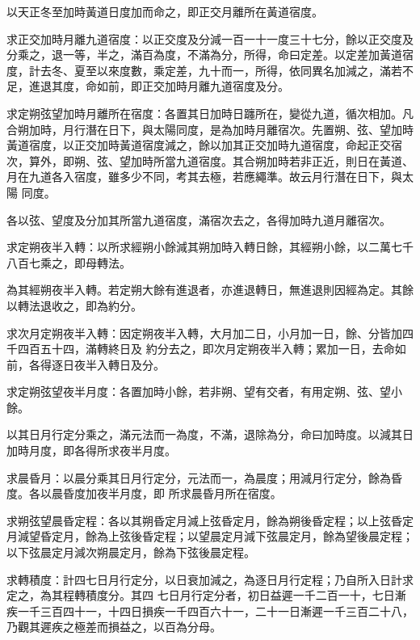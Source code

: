 \begin{pinyinscope}
 以天正冬至加時黃道日度加而命之，即正交月離所在黃道宿度。



 求正交加時月離九道宿度：以正交度及分減一百一十一度三十七分，餘以正交度及分乘之，退一等，半之，滿百為度，不滿為分，所得，命曰定差。以定差加黃道宿
 度，計去冬、夏至以來度數，乘定差，九十而一，所得，依同異名加減之，滿若不足，進退其度，命如前，即正交加時月離九道宿度及分。



 求定朔弦望加時月離所在宿度：各置其日加時日躔所在，變從九道，循次相加。凡合朔加時，月行潛在日下，與太陽同度，是為加時月離宿次。先置朔、弦、望加時黃道宿度，以正交加時黃道宿度減之，餘以加其正交加時九道宿度，命起正交宿次，算外，即朔、弦、望加時所當九道宿度。其合朔加時若非正近，則日在黃道、月在九道各入宿度，雖多少不同，考其去極，若應繩準。故云月行潛在日下，與太陽
 同度。



 各以弦、望度及分加其所當九道宿度，滿宿次去之，各得加時九道月離宿次。



 求定朔夜半入轉：以所求經朔小餘減其朔加時入轉日餘，其經朔小餘，以二萬七千八百七乘之，即母轉法。



 為其經朔夜半入轉。若定朔大餘有進退者，亦進退轉日，無進退則因經為定。其餘以轉法退收之，即為約分。



 求次月定朔夜半入轉：因定朔夜半入轉，大月加二日，小月加一日，餘、分皆加四千四百五十四，滿轉終日及
 約分去之，即次月定朔夜半入轉；累加一日，去命如前，各得逐日夜半入轉日及分。



 求定朔弦望夜半月度：各置加時小餘，若非朔、望有交者，有用定朔、弦、望小餘。



 以其日月行定分乘之，滿元法而一為度，不滿，退除為分，命曰加時度。以減其日加時月度，即各得所求夜半月度。



 求晨昏月：以晨分乘其日月行定分，元法而一，為晨度；用減月行定分，餘為昏度。各以晨昏度加夜半月度，即
 所求晨昏月所在宿度。



 求朔弦望晨昏定程：各以其朔昏定月減上弦昏定月，餘為朔後昏定程；以上弦昏定月減望昏定月，餘為上弦後昏定程；以望晨定月減下弦晨定月，餘為望後晨定程；以下弦晨定月減次朔晨定月，餘為下弦後晨定程。



 求轉積度：計四七日月行定分，以日衰加減之，為逐日月行定程；乃自所入日計求定之，為其程轉積度分。其四
 七日月行定分者，初日益遲一千二百一十，七日漸疾一千三百四十一，十四日損疾一千四百六十一，二十一日漸遲一千三百二十八，乃觀其遲疾之極差而損益之，以百為分母。




\end{pinyinscope}
